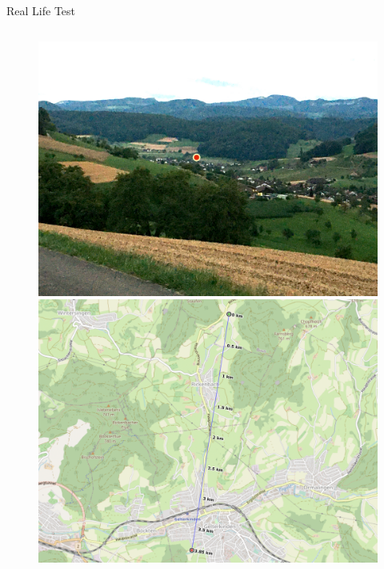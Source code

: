 \documentclass[aspectratio=169]{beamer}
\begin{document}
\begin{frame}[c]{Real Life Test}


\begin{figure}
        \begin{columns}
            \includegraphics[width=1\textwidth]{images/poc_1.JPG}
            \includegraphics[width=1\textwidth]{images/poc_2.png}
        \end{columns}        
    \end{figure}     
\end{frame}
\end{document}
